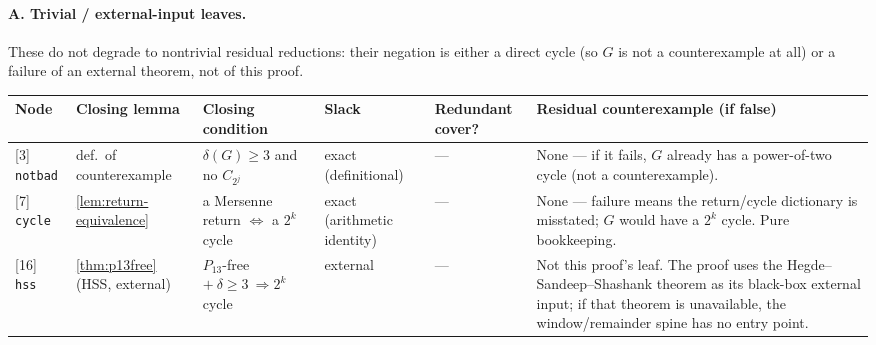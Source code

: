 \documentclass[11pt]{article}
\begin{document}
\paragraph{A. Trivial / external-input leaves.}
These do not degrade to nontrivial residual reductions: their negation is either a direct cycle (so $G$ is not a counterexample at all) or a failure of an external theorem, not of this proof.

{\scriptsize\setlength{\tabcolsep}{3pt}
\begin{longtable}{L{0.09\textwidth} L{0.095\textwidth} L{0.15\textwidth} L{0.08\textwidth} L{0.105\textwidth} L{0.335\textwidth}}
\toprule
\textbf{Node} & \textbf{Closing lemma} & \textbf{Closing condition} & \textbf{Slack} & \textbf{Redundant cover?} & \textbf{Residual counterexample (if false)} \\
\midrule
\endhead
{[3]} \texttt{notbad} & def.\ of counterexample & $\delta(G)\ge3$ and no $C_{2^j}$ & exact (definitional) & --- & None --- if it fails, $G$ already has a power-of-two cycle (not a counterexample). \\
{[7]} \texttt{cycle} & \cref{lem:return-equivalence} & a Mersenne return $\iff$ a $2^k$ cycle & exact (arithmetic identity) & --- & None --- failure means the return/cycle dictionary is misstated; $G$ would have a $2^k$ cycle. Pure bookkeeping. \\
{[16]} \texttt{hss} & \cref{thm:p13free} (HSS, external) & $P_{13}$-free $+\ \delta\ge3\ \Rightarrow 2^k$ cycle & external & --- & Not this proof's leaf. The proof uses the Hegde--Sandeep--Shashank theorem as its black-box external input; if that theorem is unavailable, the window/remainder spine has no entry point. \\
\bottomrule
\end{longtable}
}
\end{document}
